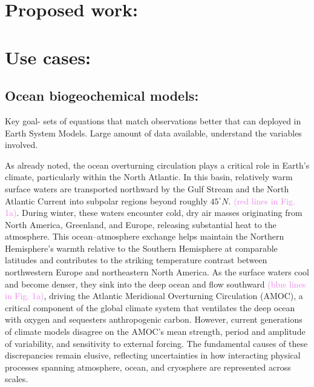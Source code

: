 \documentclass{article}
\begin{document}
\section{Proposed work:}

 

\section{Use cases:}

 

\subsection{Ocean biogeochemical models:}  

Key goal- sets of equations that match observations better that can deployed in Earth System Models. Large amount of data available, understand the variables involved. 


As already noted, the ocean overturning circulation plays a critical role in Earth’s climate, particularly within the North Atlantic.  In this basin, relatively warm surface waters are transported northward by the Gulf Stream and the North Atlantic Current into subpolar regions beyond roughly $45^\circ N$.  \textcolor{violet}{(red lines in Fig. 1a)}. During winter, these waters encounter cold, dry air masses originating from North America, Greenland, and Europe, releasing substantial heat to the atmosphere. This ocean–atmosphere exchange helps maintain the Northern Hemisphere’s warmth relative to the Southern Hemisphere at comparable latitudes and contributes to the striking temperature contrast between northwestern Europe and northeastern North America. As the surface waters cool and become denser, they sink into the deep ocean and flow southward \textcolor{violet}{(blue lines in Fig. 1a)}, driving the Atlantic Meridional Overturning Circulation (AMOC), a critical component of the global climate system that ventilates the deep ocean with oxygen and sequesters anthropogenic carbon. However, current generations of climate models disagree on the AMOC’s mean strength, period and amplitude of variability, and sensitivity to external forcing. The fundamental causes of these discrepancies remain elusive, reflecting uncertainties in how interacting physical processes spanning atmosphere, ocean, and cryosphere are represented across scales. 
\end{document}

